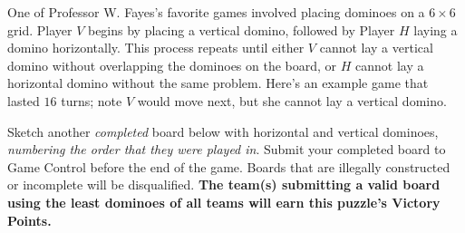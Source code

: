 


  One of Professor W. Fayes's favorite games involved placing dominoes
  on a \(6\times6\) grid. Player \(V\) begins by placing a vertical domino,
  followed by Player \(H\) laying a domino horizontally. This process repeats
  until either \(V\) cannot lay a vertical domino without overlapping
  the dominoes on the board, or \(H\) cannot lay a horizontal domino without
  the same problem. Here's an example game that lasted \(16\) turns;
  note \(V\) would move next, but she cannot lay a vertical
  domino.

\newcommand{\phDominoVertical}[2]{
  \draw[fill=gray] ($(#1)+(0.1,0.1)$) rectangle ($(#1)+(0.9,1.9)$);
  \node at ($(#1)+(0.5,1)$) {#2};
}
\newcommand{\phDominoHorizontal}[2]{
  \draw[fill=lightgray] ($(#1)+(0.1,0.1)$) rectangle ($(#1)+(1.9,0.9)$);
  \node at ($(#1)+(1,0.5)$) {#2};
}

    \begin{center}
    \end{center}

    Sketch another \textit{completed} board
    below with horizontal and vertical dominoes,
    \textit{numbering the order that they were played in}. Submit your
    completed board to Game Control before the end of the game.
    Boards that are illegally constructed or
    incomplete will be disqualified.
    \textbf{The team(s) submitting a valid board using
    the least dominoes of all teams will earn this puzzle's Victory Points.}

    \begin{center}
    \end{center}

%
%
